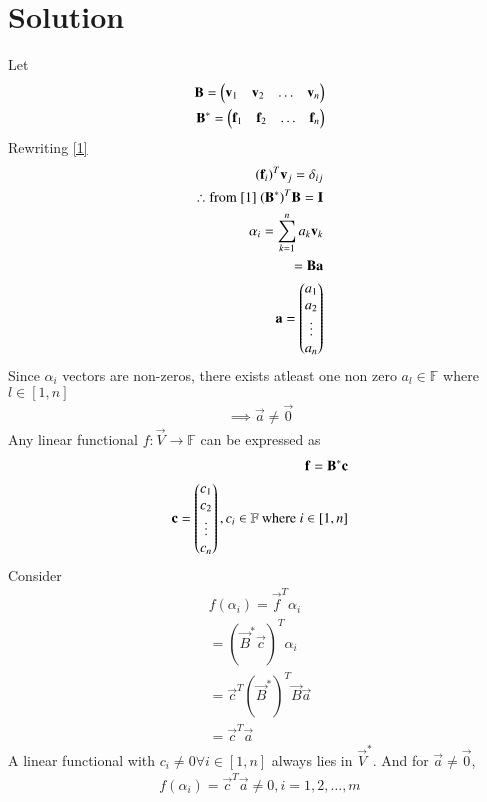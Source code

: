 \documentclass[journal,12pt,twocolumn]{IEEEtran}
\begin{document}
\section{Solution}
Let
\begin{align}
    \mathbf{B}=\begin{pmatrix}\mathbf{v}_1&\mathbf{v}_2&\hdots&\mathbf{v}_n\end{pmatrix}\\
    \mathbf{B}^*=\begin{pmatrix}\mathbf{f}_1&\mathbf{f}_2&\hdots&\mathbf{f}_n\end{pmatrix}
    \end{align}
    Rewriting \eqref{1}
    \begin{align}
        (\mathbf{f}_i)^T\mathbf{v}_j=\delta_{ij}\\
    \therefore \text{from \eqref{1}  } (\mathbf{B}^*)^T\mathbf{B}=\mathbf{I}\label{2}\\
    \alpha_i=\sum _{k=1}^n a_k\mathbf{v}_k\\
    =\mathbf{B}\mathbf{a}\\
    \mathbf{a}=\begin{pmatrix}a_1\\a_2\\\vdots\\a_n\end{pmatrix}
\end{align}
Since $\alpha_i$ vectors are non-zeros, there exists atleast one non zero $a_l \in \mathbb{F}$ where $l \in [1,n]$ 
\begin{align}
    \implies \vec{a}\neq \vec{0}
\end{align}
Any linear functional $f:\vec{V}\rightarrow \mathbb{F}$ can be expressed as
\begin{align}
    \mathbf{f}=\mathbf{B}^*\mathbf{c}\\
    \mathbf{c}=\begin{pmatrix}c_1\\c_2\\\vdots\\c_n\end{pmatrix}, c_i \in \mathbb{F} \text{ where }i \in [1,n]
\end{align}
Consider
\begin{align}
    f(\alpha_i)=\vec{f}^T\alpha_i\\
    =(\vec{B}^*\vec{c})^T\alpha_i\\
    =\vec{c}^T(\vec{B}^*)^T\vec{B}\vec{a}\\
    =\vec{c}^T\vec{a}
\end{align}
A linear functional with $c_i \neq 0 \forall i \in [1,n]$ always lies in $\vec{V}^*$. And for $\vec{a}\neq \vec{0}$,
\begin{align}
    f(\alpha_i)=\vec{c}^T\vec{a}\neq 0,i=1,2,\hdots,m
\end{align}
\end{document}
